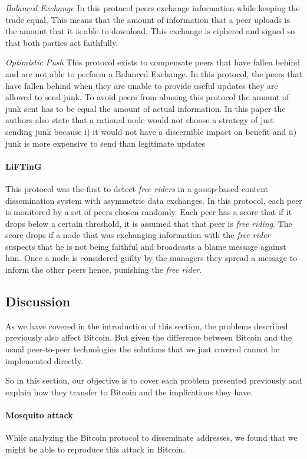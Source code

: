 \textit{Balanced Exchange} In this protocol peers exchange information while keeping the trade equal. This means that the amount of information that a peer uploads is the amount that it is able to download. This exchange is ciphered and signed so that both parties act faithfully.

\textit{Optimistic Push} This protocol exists to compensate peers that have fallen behind and are not able to perform a Balanced Exchange. In this protocol, the peers that have fallen behind when they are unable to provide useful updates they are allowed to send junk. To avoid peers from abusing this protocol the amount of junk sent has to be equal the amount of actual information. In this paper the authors also state that a rational node would not choose a strategy of just sending junk because i) it would not have a discernible impact on benefit and ii) junk is more expensive to send than legitimate updates

\paragraph*{\textbf{LiFTinG} \cite{guerraoui2010lifting}}
This protocol was the first to detect \textit{free riders} in a gossip-based content dissemination system with asymmetric data exchanges.
In this protocol, each peer is monitored by a set of peers chosen randomly. Each peer has a score that if it drops below a certain threshold, it is assumed that that peer is \textit{free riding}. The score drops if a node that was exchanging information with the \textit{free rider} suspects that he is not being faithful and broadcasts a blame message against him. Once a node is considered guilty by the managers they spread a message to inform the other peers hence, punishing the \textit{free rider}.


\subsection{Discussion}
\label{sec:rpsummary}
As we have covered in the introduction of this section, the problems described previously also affect Bitcoin. But given the difference between Bitcoin and the usual peer-to-peer technologies the solutions that we just covered cannot be implemented directly.

So in this section, our objective is to cover each problem presented previously and explain how they transfer to Bitcoin and the implications they have.

\paragraph*{\textbf{Mosquito attack}} While analyzing the Bitcoin protocol to disseminate addresses, we found that we might be able to reproduce this attack in Bitcoin.

